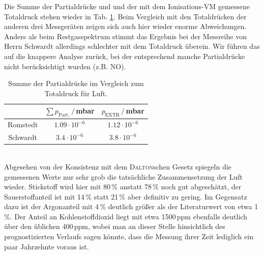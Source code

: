 \documentclass[german, parskip=full]{scrartcl}
\newcommand{\tecxt}{}
\begin{document}
Die Summe der Partialdrücke und und der mit dem Ionisations-VM gemessene Totaldruck stehen wieder in Tab. \ref{table:DaltonLuft}. Beim Vergleich mit den Totaldrücken der anderen drei Messgeräten zeigen sich auch hier wieder enorme Abweichungen. Anders als beim Restgasspektrum stimmt das Ergebnis bei der Messreihe von Herrn Schwardt allerdings schlechter mit dem Totaldruck überein. Wir führen das auf die knappere Analyse zurück, bei der entsprechend manche Partialdrücke nicht berücksichtigt wurden (z.B. $\tecxt\text{NO}$).
\begin{table}[h!]
\centering
\begin{tabular}{c|c|c}
&$\sum p_\tecxt\text{Part.}\,/\,$mbar&$p_\tecxt\text{EXTR}\,/\,$mbar\\ \hline
Romstedt&$1.09\cdot 10^{-6}$&$1.12\cdot 10^{-6}$\\ \hline
Schwardt&$3.4\cdot 10^{-6}$&$3.8\cdot 10^{-6}$\\
\end{tabular}
\caption{Summe der Partialdrücke im Vergleich zum Totaldruck für Luft.}
\label{table:DaltonLuft}
\end{table}\\
Abgesehen von der Konsistenz mit dem \textsc{Dalton}schen Gesetz spiegeln die gemessenen Werte nur sehr grob die tatsächliche Zusammensetzung der Luft wieder. Stickstoff wird hier mit 80\,\% anstatt 78\,\% noch gut abgeschätzt, der Sauerstoffanteil ist mit 14\,\% statt 21\,\% aber definitiv zu gering. Im Gegensatz dazu ist der Argonanteil mit 4\,\% deutlich größer als der Literaturwert von etwa 1\,\%. Der Anteil an Kohlenstoffdioxid liegt mit etwa 1500\,ppm ebenfalls deutlich über den üblichen 400\,ppm, wobei man an dieser Stelle hinsichtlich des prognostizierten Verlaufs sagen könnte, dass die Messung ihrer Zeit lediglich ein paar Jahrzehnte voraus ist.
\end{document}
